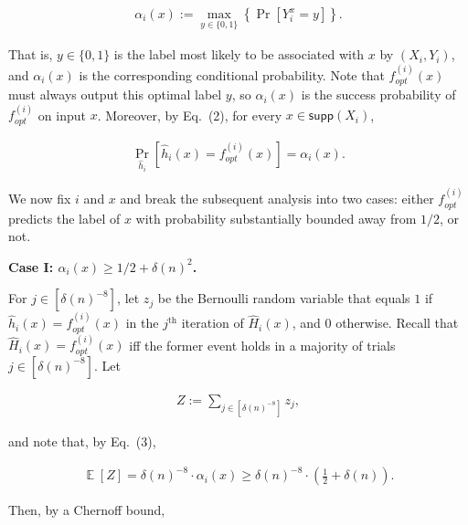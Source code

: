 \[\begin{gathered}
\alpha_{i}(x):=\max_{y\in\{0,1\}}\left\{\Pr[Y_{i}^{x}=y]\right\}.
\end{gathered}\]


That is, $y\in\{0,1\}$ is the label most likely to be associated with $x$ by $(X_{i},Y_{i})$, and $\alpha_{i}(x)$ is the corresponding conditional probability. Note that $f_{opt}^{(i)}(x)$ must always output this optimal label $y$, so $\alpha_{i}(x)$ is the success probability of $f_{opt}^{(i)}$ on input $x$. Moreover, by Eq. (2), for every $x\in{\mathsf{supp}}(X_{i})$,\par


\[\begin{gathered}
\displaystyle\Pr_{\hat{h}_{i}}\left[\hat{h}_{i}(x)=f_{opt}^{(i)}(x)\right]=\alpha_{i}(x).
\end{gathered}\]




We now fix $i$ and $x$ and break the subsequent analysis into two cases: either $f_{opt}^{(i)}$ predicts the label of $x$ with probability substantially bounded away from $1/2$, or not.\par





\par\medskip\noindent\textbf{Case I: $\alpha_{i}(x)\geq 1/2+\delta(n)^{2}$.}\par




For $j\in[\delta(n)^{-8}]$, let $z_{j}$ be the Bernoulli random variable that equals $1$ if $\hat{h}_{i}(x)=f_{opt}^{(i)}(x)$ in the $j^{\text{th}}$ iteration of $\hat{H}_{i}(x)$, and $0$ otherwise. Recall that $\hat{H}_{i}(x)=f_{opt}^{(i)}(x)$ iff the former event holds in a majority of trials $j\in[\delta(n)^{-8}]$. Let\par


\[\begin{gathered}
Z:=\sum_{j\in[\delta(n)^{-8}]}z_{j},
\end{gathered}\]


and note that, by Eq. (3),\par


\[\begin{gathered}
\mathop{\mathbb{E}}[Z]=\delta(n)^{-8}\cdot\alpha_{i}(x)\geq\delta(n)^{-8}\cdot\left(\frac{1}{2}+\delta(n)\right).
\end{gathered}\]


Then, by a Chernoff bound,\par


